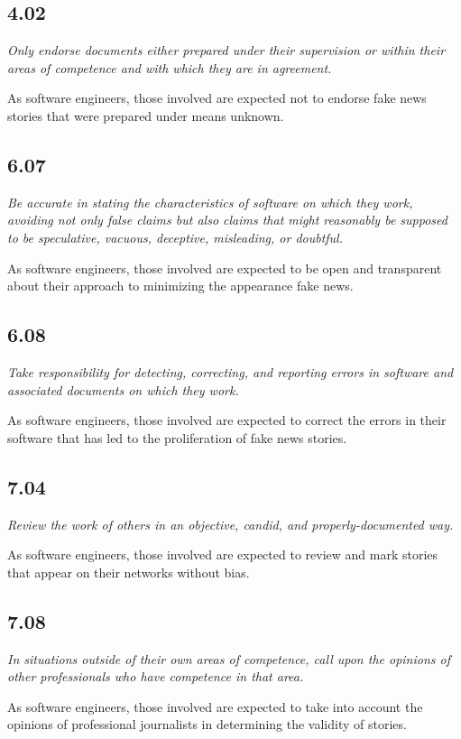 \subsection{4.02}

\emph{Only endorse documents either prepared under their supervision or within their areas of competence and with which they are in agreement.}

As software engineers, those involved are expected not to endorse fake news stories that were prepared under means unknown.

\subsection{6.07}

\emph{Be accurate in stating the characteristics of software on which they work, avoiding not only false claims but also claims that might reasonably be supposed to be speculative, vacuous, deceptive, misleading, or doubtful.}

As software engineers, those involved are expected to be open and transparent about their approach to minimizing the appearance fake news.

\subsection{6.08}

\emph{Take responsibility for detecting, correcting, and reporting errors in software and associated documents on which they work.}

As software engineers, those involved are expected to correct the errors in their software that has led to the proliferation of fake news stories.

\subsection{7.04}

\emph{Review the work of others in an objective, candid, and properly-documented way.}

As software engineers, those involved are expected to review and mark stories that appear on their networks without bias.

\subsection{7.08}

\emph{In situations outside of their own areas of competence, call upon the opinions of other professionals who have competence in that area.}

As software engineers, those involved are expected to take into account the opinions of professional journalists in determining the validity of stories. 